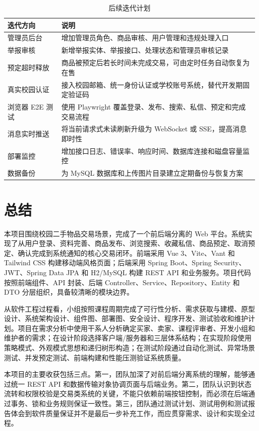 ﻿\documentclass[UTF8,a4paper,12pt]{ctexart}
\begin{document}
\begin{table}[H]
  \centering
  \caption{后续迭代计划}
  \label{tab:future-plan}
  \begin{tabular}{p{3.2cm}p{9.4cm}}
    \toprule
    迭代方向 & 说明 \\
    \midrule
    管理员后台 & 增加管理员角色、商品审核、用户管理和违规处理入口 \\
    举报审核 & 新增举报实体、举报接口、处理状态和管理员审核记录 \\
    预定超时释放 & 商品被预定后若长时间未完成交易，可由定时任务自动恢复为在售 \\
    真实校园认证 & 接入校园邮箱、统一身份认证或学校账号系统，替代开发期固定验证码 \\
    浏览器 E2E 测试 & 使用 Playwright 覆盖登录、发布、搜索、私信、预定和完成交易流程 \\
    消息实时推送 & 将当前请求式未读刷新升级为 WebSocket 或 SSE，提高消息即时性 \\
    部署监控 & 增加接口日志、错误率、响应时间、数据库连接和磁盘容量监控 \\
    数据备份 & 为 MySQL 数据库和上传图片目录建立定期备份与恢复方案 \\
    \bottomrule
  \end{tabular}
\end{table}

\section{总结}
本项目围绕校园二手物品交易场景，完成了一个前后端分离的 Web 平台。系统实现了从用户登录、资料完善、商品发布、浏览搜索、收藏私信、商品预定、取消预定、确认完成到系统通知的核心交易闭环。前端采用 Vue 3、Vite、Vant 和 Tailwind CSS 构建移动端风格页面；后端采用 Spring Boot、Spring Security、JWT、Spring Data JPA 和 H2/MySQL 构建 REST API 和业务服务。项目代码按照前端组件、API 封装、后端 Controller、Service、Repository、Entity 和 DTO 分层组织，具备较清晰的模块边界。

从软件工程过程看，小组按照课程周期完成了可行性分析、需求获取与建模、原型设计、系统架构设计、组件图、部署图、安全设计、程序开发、测试验收和维护计划。项目在需求分析中使用干系人分析确定买家、卖家、课程评审者、开发小组和维护者的需求；在设计阶段选择客户端/服务器和三层体系结构；在实现阶段使用策略模式、外观模式思想和递归树形构造；在测试阶段通过自动化测试、异常场景测试、并发预定测试、前端构建和性能压测验证系统质量。

本项目的主要收获包括三点。第一，团队加深了对前后端分离系统的理解，能够通过统一 REST API 和数据传输对象协调页面与后端业务。第二，团队认识到状态流转和权限校验是交易类系统的关键，不能只依赖前端按钮控制，而必须在后端通过事务、锁和业务规则保证一致性。第三，团队通过测试计划、测试用例和测试报告体会到软件质量保证并不是最后一步补充工作，而应贯穿需求、设计和实现全过程。
\end{document}
